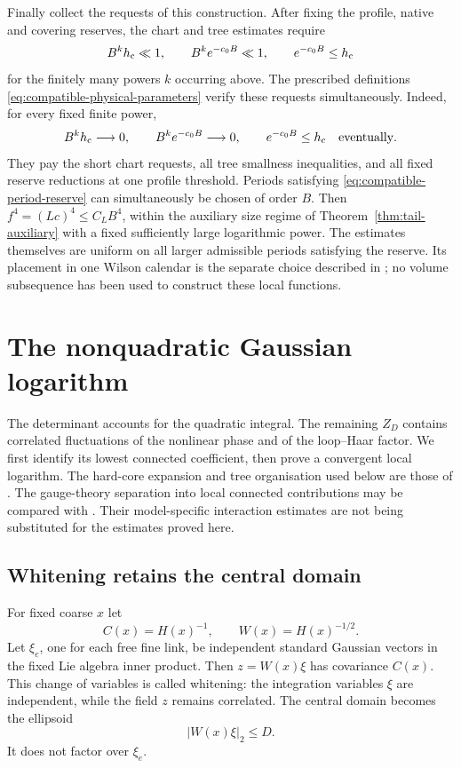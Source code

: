 \documentclass[11pt,reqno]{amsart}
\numberwithin{equation}{section}
\theoremstyle{definition}
\theoremstyle{remark}
\begin{document}
Finally collect the requests of this construction.
After fixing the profile, native and covering reserves,
the chart and tree estimates require
\[
 B^kh_{\rm c}\ll1,\qquad B^ke^{-c_0B}\ll1,\qquad
                                      e^{-c_0B}\le h_{\rm c}
\]
for the finitely many powers \(k\) occurring above.
The prescribed definitions
\eqref{eq:compatible-physical-parameters} verify these
requests simultaneously. Indeed, for every fixed finite power,
\[
       B^k h_{\rm c}\longrightarrow0,\qquad
       B^k e^{-c_0B}\longrightarrow0,\qquad
                         e^{-c_0B}\le h_{\rm c}
                         \quad\hbox{eventually}.
\]
They pay the short chart requests,
all tree smallness inequalities, and
all fixed reserve reductions at one
profile threshold.
Periods satisfying
\eqref{eq:compatible-period-reserve}
can simultaneously be chosen of order
\(B\). Then \(f^4=(Lc)^4\le C_LB^4\),
within the auxiliary size regime of
Theorem~\ref{thm:tail-auxiliary} with
a fixed sufficiently large logarithmic
power. The estimates themselves are
uniform on all larger admissible
periods satisfying the reserve.
Its placement in one Wilson calendar
is the separate choice described in
\cite[Section~26.4, p.~142]{Main};
no volume subsequence has been used
to construct these local functions.


\section{The nonquadratic Gaussian logarithm}
\label{sec:connected-Gaussian-logarithm}

The determinant accounts for the quadratic integral.
The remaining \(Z_D\) contains correlated fluctuations
of the nonlinear phase and of the loop--Haar factor.
We first identify its lowest connected coefficient,
then prove a convergent local logarithm.
The hard-core expansion and tree organisation used
below are those of
\cite[Section~2, (2.2)--(2.7), preprint pp.~3--4;
Section~4.1, Proposition~5, pp.~10--11]{FP07}.
The gauge-theory separation into local connected
contributions may be compared with
\cite[Section~2, (2.11)--(2.13), printed p.~14]{Bal88a}.
Their model-specific interaction estimates are not
being substituted for the estimates proved here.

\subsection{Whitening retains the central domain}

For fixed coarse \(x\) let
\[
             C(x)=H(x)^{-1},\qquad
             W(x)=H(x)^{-1/2}.
\]
Let \(\xi_e\), one for each free fine link,
be independent standard Gaussian vectors in the
fixed Lie algebra inner product.
Then \(z=W(x)\xi\) has covariance \(C(x)\).
This change of variables is called whitening:
the integration variables \(\xi\) are independent,
while the field \(z\) remains correlated.
The central domain becomes the ellipsoid
\[
                            |W(x)\xi|_2\le D .
\]
It does not factor over \(\xi_e\).
\end{document}
